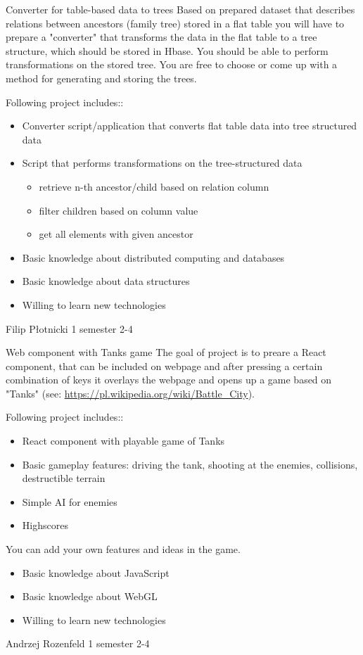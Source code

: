 \begin{project}
{Converter for table-based data to trees}
{Based on prepared dataset that describes relations between ancestors (family tree) stored in a flat table you will have to prepare a "converter" that transforms the data in the flat table to a tree structure, which should be stored in Hbase. You should be able to perform transformations on the stored tree. You are free to choose or come up with a method for generating and storing the trees.}
{
Following project includes::
\begin{itemize}
	\item Converter script/application that converts flat table data into tree structured data
	\item Script that performs transformations on the tree-structured data
		\begin{itemize}
			\item retrieve n-th ancestor/child based on relation column
			\item filter children based on column value
			\item get all elements with given ancestor
		\end{itemize}
\end{itemize}
}
{
\begin{itemize}
	\item Basic knowledge about distributed computing and databases
	\item Basic knowledge about data structures
	\item Willing to learn new technologies
\end{itemize}
}
{Filip Płotnicki}
{1 semester}
{2-4}
\end{project}
\begin{project}
{Web component with Tanks game}
{The goal of project is to preare a React component, that can be included on webpage and after pressing a certain combination of keys it overlays the webpage and opens up a game based on "Tanks" (see: \url{https://pl.wikipedia.org/wiki/Battle_City}).}
{
Following project includes::
\begin{itemize}
	\item React component with playable game of Tanks
	\item Basic gameplay features: driving the tank, shooting at the enemies, collisions, destructible terrain
	\item Simple AI for enemies
	\item Highscores
\end{itemize}
 You can add your own features and ideas in the game.
}
{
\begin{itemize}
	\item Basic knowledge about JavaScript
	\item Basic knowledge about WebGL
	\item Willing to learn new technologies
\end{itemize}
}
{Andrzej Rozenfeld}
{1 semester}
{2-4}
\end{project}
